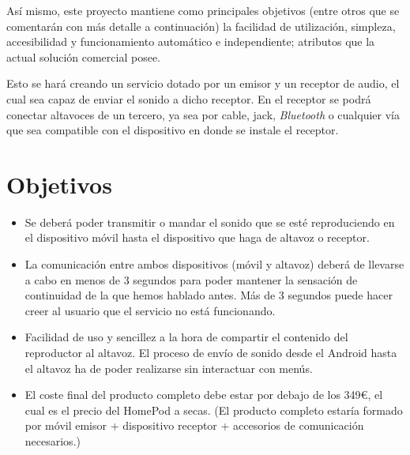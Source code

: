 Así mismo, este proyecto mantiene como principales objetivos (entre otros que se
comentarán con más detalle a continuación) la facilidad de utilización,
simpleza, accesibilidad y funcionamiento automático e independiente; atributos
que la actual solución comercial posee.

Esto se hará creando un servicio dotado por un emisor y un receptor de audio, el
cual sea capaz de enviar el sonido a dicho receptor. En el receptor se podrá
conectar altavoces de un tercero, ya sea por cable, jack, \emph{Bluetooth} o
cualquier vía que sea compatible con el dispositivo en donde se instale el
receptor.

\section{Objetivos}
\begin{itemize}
    \item Se deberá poder transmitir o mandar el sonido que se esté
    reproduciendo en el dispositivo móvil hasta el dispositivo que haga de
    altavoz o receptor.
    \item La comunicación entre ambos dispositivos (móvil y altavoz) deberá de
    llevarse a cabo en menos de 3 segundos para poder mantener la sensación de
    continuidad de la que hemos hablado antes. Más de 3 segundos puede hacer
    creer al usuario que el servicio no está funcionando.
    \item Facilidad de uso y sencillez a la hora de compartir el contenido del
    reproductor al altavoz. El proceso de envío de sonido desde el Android hasta
    el altavoz ha de poder realizarse sin interactuar con menús.
    \item El coste final del producto completo debe estar por debajo de los
    349€, el cual es el precio del HomePod a secas. (El producto completo
    estaría formado por móvil emisor + dispositivo receptor + accesorios de
    comunicación necesarios.)
\end{itemize}

